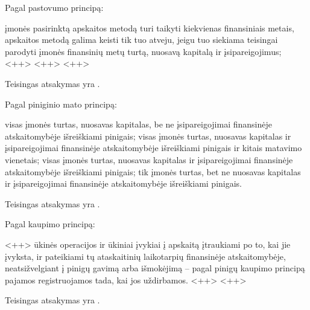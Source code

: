 \begin{tasks}
  \begin{task}
    \begin{condition}
      Pagal pastovumo principą:
      \begin{enumerate}
         įmonės pasirinktą apskaitos metodą turi taikyti
          kiekvienas finansiniais metais, apskaitos metodą galima
          keisti tik tuo atveju, jeigu tuo siekiama teisingai
          parodyti įmonės finansinių metų turtą, nuosavą kapitalą
          ir įsipareigojimus;
         <++>
         <++>
         <++>
      \end{enumerate}
    \end{condition}
    \begin{solution}
      Teisingas atsakymas yra .
    \end{solution}
  \end{task}

  \begin{task}
    \begin{condition}
      Pagal piniginio mato principą:
      \begin{enumerate}
         visas įmonės turtas, nuosavas kapitalas, be ne
          įsipareigojimai finansinėje atskaitomybėje išreiškiami
          pinigais;
         visas įmonės turtas, nuosavas kapitalas ir
          įsipareigojimai finansinėje atskaitomybėje išreiškiami
          pinigais ir kitais matavimo vienetais;
         visas įmonės turtas, nuosavas kapitalas ir
          įsipareigojimai finansinėje atskaitomybėje išreiškiami
          pinigais;
         tik įmonės turtas, bet ne nuosavas kapitalas ir
          įsipareigojimai finansinėje atskaitomybėje išreiškiami
          pinigais.
      \end{enumerate}
    \end{condition}
    \begin{solution}
      Teisingas atsakymas yra .
    \end{solution}
  \end{task}

  \begin{task}
    \begin{condition}
      Pagal kaupimo principą:
      \begin{enumerate}
         <++>
         ūkinės operacijos ir ūkiniai įvykiai į apskaitą
          įtraukiami po to, kai jie įvyksta, ir pateikiami tų
          ataskaitinių laikotarpių finansinėje atskaitomybėje,
          neatsižvelgiant į pinigų gavimą arba išmokėjimą – pagal
          pinigų kaupimo principą pajamos registruojamos tada, kai
          jos uždirbamos.
         <++>
         <++>
      \end{enumerate}
    \end{condition}
    \begin{solution}
      Teisingas atsakymas yra .
    \end{solution}
  \end{task}


\end{tasks}
